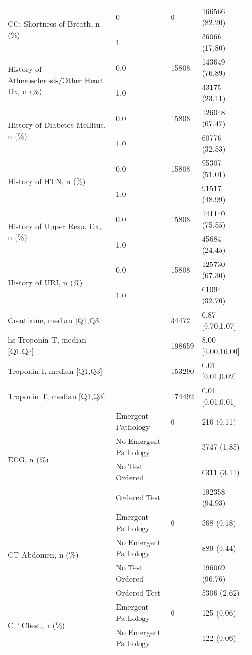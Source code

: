 \begin{tabular}{llll}
\cline{1-4}
\multirow[t]{2}{*}{CC: Shortness of Breath, n (\%)} & 0 & 0 & 166566 (82.20) \\
 & 1 &  & 36066 (17.80) \\
\cline{1-4}
\multirow[t]{2}{*}{History of Atherosclerosis/Other Heart Dx, n (\%)} & 0.0 & 15808 & 143649 (76.89) \\
 & 1.0 &  & 43175 (23.11) \\
\cline{1-4}
\multirow[t]{2}{*}{History of Diabetes Mellitus, n (\%)} & 0.0 & 15808 & 126048 (67.47) \\
 & 1.0 &  & 60776 (32.53) \\
\cline{1-4}
\multirow[t]{2}{*}{History of HTN, n (\%)} & 0.0 & 15808 & 95307 (51.01) \\
 & 1.0 &  & 91517 (48.99) \\
\cline{1-4}
\multirow[t]{2}{*}{History of Upper Resp. Dx, n (\%)} & 0.0 & 15808 & 141140 (75.55) \\
 & 1.0 &  & 45684 (24.45) \\
\cline{1-4}
\multirow[t]{2}{*}{History of URI, n (\%)} & 0.0 & 15808 & 125730 (67.30) \\
 & 1.0 &  & 61094 (32.70) \\
\cline{1-4}
Creatinine, median [Q1,Q3] &  & 34472 & 0.87 [0.70,1.07] \\
\cline{1-4}
hs Troponin T, median [Q1,Q3] &  & 198659 & 8.00 [6.00,16.00] \\
\cline{1-4}
Troponin I, median [Q1,Q3] &  & 153290 & 0.01 [0.01,0.02] \\
\cline{1-4}
Troponin T, median [Q1,Q3] &  & 174492 & 0.01 [0.01,0.01] \\
\cline{1-4}
\multirow[t]{4}{*}{ECG, n (\%)} & Emergent Pathology & 0 & 216 (0.11) \\
 & No Emergent Pathology &  & 3747 (1.85) \\
 & No Test Ordered &  & 6311 (3.11) \\
 & Ordered Test &  & 192358 (94.93) \\
\cline{1-4}
\multirow[t]{4}{*}{CT Abdomen, n (\%)} & Emergent Pathology & 0 & 368 (0.18) \\
 & No Emergent Pathology &  & 889 (0.44) \\
 & No Test Ordered &  & 196069 (96.76) \\
 & Ordered Test &  & 5306 (2.62) \\
\cline{1-4}
\multirow[t]{4}{*}{CT Chest, n (\%)} & Emergent Pathology & 0 & 125 (0.06) \\
 & No Emergent Pathology &  & 122 (0.06) \\

\end{tabular}
